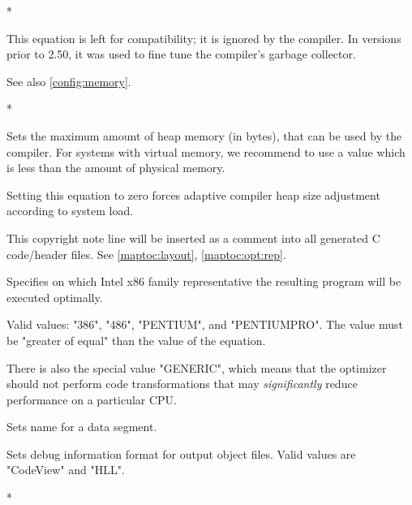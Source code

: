\begin{description}
        \MLBegin{}*\MLEnd{}

        This equation is left for compatibility; it is ignored by
        the compiler. In versions prior to 2.50, it was used to fine tune
        the compiler's garbage collector. 

        See also \ref{config:memory}.

        \MLBegin{}*\MLEnd{}

        Sets the maximum amount of heap memory (in bytes),
        that can be used by the compiler.
        For systems with virtual memory, we recommend to use
        a value which is less than the amount of physical memory.

        Setting this equation to zero forces adaptive
        compiler heap size adjustment according to system load.


\ifgenc
{}
        \MLBegin{}\ModeC{}\MLEnd{}

        This copyright  note  line  will be inserted as
        a comment into all generated C code/header
        files. See \ref{maptoc:layout}, \ref{maptoc:opt:rep}.
\fi

\ifgencode
{}
        \MLBegin{}\ModeC{}\MLEnd{}

        Specifies on which Intel x86 family representative
        the resulting program will be executed optimally.

        Valid values: "386", "486", "PENTIUM", and "PENTIUMPRO".
        The value must be "greater of equal" than the value
        of the  equation.

        There is also the special value "GENERIC", which means
        that the optimizer should not perform code transformations
        that may {\it significantly} reduce performance on a
        particular CPU.
\fi

\ifgencode
{}
        \MLBegin{}\ModeC{}\MLEnd{} \header

        Sets name for a data segment.
\fi

\ifgencode
{}
        \MLBegin{}\ModeC{}\MLEnd{}

        Sets debug information format for output object files.
        Valid values are "CodeView" and "HLL".
\fi

        \MLBegin{}*\MLEnd{}


\end{description}
